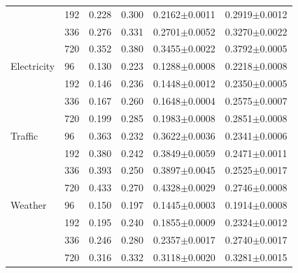 {\begin{table}[t]
{\begin{tabular}{llcccc}
 & 192 & 0.228 & 0.300 & 0.2162{\scriptsize$\pm$0.0011} & 0.2919{\scriptsize$\pm$0.0012} \\
 & 336 & 0.276 & 0.331 & 0.2701{\scriptsize$\pm$0.0052} & 0.3270{\scriptsize$\pm$0.0022} \\
 & 720 & 0.352 & 0.380 & 0.3455{\scriptsize$\pm$0.0022} & 0.3792{\scriptsize$\pm$0.0005} \\
\midrule
Electricity & 96 & 0.130 & 0.223 & 0.1288{\scriptsize$\pm$0.0008} & 0.2218{\scriptsize$\pm$0.0008} \\
 & 192 & 0.146 & 0.236 & 0.1448{\scriptsize$\pm$0.0012} & 0.2350{\scriptsize$\pm$0.0005} \\
 & 336 & 0.167 & 0.260 & 0.1648{\scriptsize$\pm$0.0004} & 0.2575{\scriptsize$\pm$0.0007} \\
 & 720 & 0.199 & 0.285 & 0.1983{\scriptsize$\pm$0.0008} & 0.2851{\scriptsize$\pm$0.0008} \\
\midrule
Traffic & 96 & 0.363 & 0.232 & 0.3622{\scriptsize$\pm$0.0036} & 0.2341{\scriptsize$\pm$0.0006} \\
 & 192 & 0.380 & 0.242 & 0.3849{\scriptsize$\pm$0.0059} & 0.2471{\scriptsize$\pm$0.0011} \\
 & 336 & 0.393 & 0.250 & 0.3897{\scriptsize$\pm$0.0045} & 0.2525{\scriptsize$\pm$0.0017} \\
 & 720 & 0.433 & 0.270 & 0.4328{\scriptsize$\pm$0.0029} & 0.2746{\scriptsize$\pm$0.0008} \\
\midrule
Weather & 96 & 0.150 & 0.197 & 0.1445{\scriptsize$\pm$0.0003} & 0.1914{\scriptsize$\pm$0.0008} \\
 & 192 & 0.195 & 0.240 & 0.1855{\scriptsize$\pm$0.0009} & 0.2324{\scriptsize$\pm$0.0012} \\
 & 336 & 0.246 & 0.280 & 0.2357{\scriptsize$\pm$0.0017} & 0.2740{\scriptsize$\pm$0.0017} \\
 & 720 & 0.316 & 0.332 & 0.3118{\scriptsize$\pm$0.0020} & 0.3281{\scriptsize$\pm$0.0015} \\
\bottomrule
\end{tabular}
}
\end{table}

}

